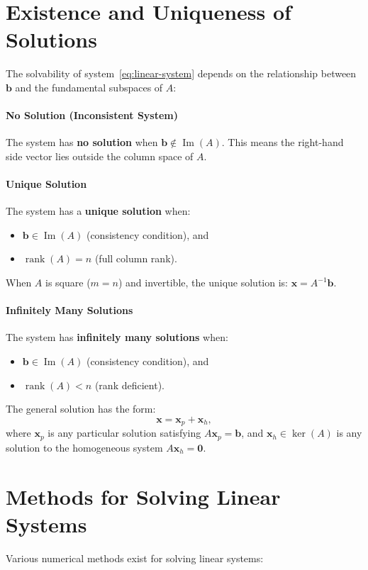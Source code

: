 \section{Existence and Uniqueness of Solutions}
The solvability of system~\eqref{eq:linear-system} depends on the relationship between $\mathbf{b}$ and the fundamental subspaces of $A$:

\paragraph{No Solution (Inconsistent System)}
The system has \textbf{no solution} when $\mathbf{b} \notin \operatorname{Im}(A)$. This means the right-hand side vector lies outside the column space of $A$.
\paragraph{Unique Solution}
The system has a \textbf{unique solution} when:
\begin{itemize}
    \item $\mathbf{b} \in \operatorname{Im}(A)$ (consistency condition), and
    \item $\operatorname{rank}(A) = n$ (full column rank).
\end{itemize}
When $A$ is square ($m = n$) and invertible, the unique solution is: $\mathbf{x} = A^{-1}\mathbf{b}.$

\paragraph{Infinitely Many Solutions}
The system has \textbf{infinitely many solutions} when:
\begin{itemize}
    \item $\mathbf{b} \in \operatorname{Im}(A)$ (consistency condition), and
    \item $\operatorname{rank}(A) < n$ (rank deficient).
\end{itemize}
The general solution has the form:
\[
    \mathbf{x} = \mathbf{x}_p + \mathbf{x}_h,
\]
where $\mathbf{x}_p$ is any particular solution satisfying $A\mathbf{x}_p = \mathbf{b}$, and $\mathbf{x}_h \in \ker(A)$ is any solution to the homogeneous system $A\mathbf{x}_h = \mathbf{0}$.

\section{Methods for Solving Linear Systems}
Various numerical methods exist for solving linear systems:

